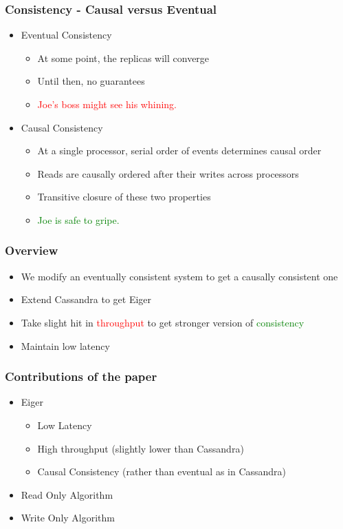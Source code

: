 \documentclass{beamer}
\begin{document}
\begin{frame}
\frametitle{Consistency - Causal versus Eventual}
\begin{itemize}
\pause \item Eventual Consistency
	\begin{itemize}
		\item At some point, the replicas will converge
		\item Until then, no guarantees
		\pause\item \textcolor{red}{Joe's boss might see his whining.}	
	\end{itemize}

\pause \item Causal Consistency
	\begin{itemize}
		\item At a single processor, serial order of events determines causal order
		\item Reads are causally ordered after their writes across processors
		\item Transitive closure of these two properties
		\pause\item \textcolor{green}{Joe is safe to gripe.}
	\end{itemize}

\end{itemize}  
\end{frame}


\begin{frame}
\frametitle{Overview}
\begin{itemize}

\item We modify an eventually consistent system to get a causally consistent one
\item Extend Cassandra to get Eiger
\pause \item Take slight hit in \textcolor{red}{throughput} \newline to get stronger version of \textcolor{green}{consistency}
\pause \item Maintain low latency

\end{itemize}  
\end{frame}

\begin{frame}
\frametitle{Contributions of the paper} 
\begin{itemize}
\pause \item Eiger
	\begin{itemize}
		\item Low Latency
		\item High throughput (slightly lower than Cassandra)
		\item Causal Consistency (rather than eventual as in Cassandra)
	\end{itemize}
\pause \item Read Only Algorithm
\pause \item Write Only Algorithm
\end{itemize}  
\end{frame}
\end{document}
